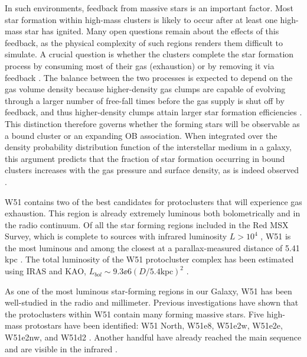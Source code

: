 In such environments, feedback from massive stars is an important factor.  Most star
formation within high-mass clusters is likely to occur after at least one
high-mass star has ignited.  Many open questions remain about the effects of
this feedback, as the physical complexity of such regions renders them
difficult to simulate.  A crucial question is whether the clusters complete the
star formation process by consuming most of their gas (exhaustion) or
by removing it via feedback 
\citep[expulsion;][]{Kruijssen2012b,Longmore2014a,Matzner2015a}.
The balance between the two processes is expected to depend on the gas volume
density because higher-density gas clumps are capable of evolving through a
larger number of free-fall times before the gas supply is shut off by feedback,
and thus higher-density clumps attain larger star formation efficiencies
\citep{Kruijssen2012b}.
This distinction therefore governs whether the forming stars will be observable as a
bound cluster or an expanding OB association.
When integrated over the density probability distribution function of the
interstellar medium in a galaxy, this argument predicts that the fraction of
star formation occurring in bound clusters increases with the gas pressure and
surface density, as is indeed observed \citep{Goddard2010a,Kruijssen2012a,Adamo2015a}.


W51 contains two of the best candidates for protoclusters that will experience
gas exhaustion.  This region is already extremely luminous both bolometrically
and in the radio continuum.  Of all the star forming regions included in the
Red MSX Survey, which is complete to sources with infrared luminosity $L>10^4$
\lsun, W51 is the most luminous \citep{Urquhart2014a} and among the closest at
a parallax-measured distance of 5.41 kpc \citep{Sato2010a,Xu2009a}.  The total
luminosity of the W51 protocluster complex has been estimated using IRAS and
KAO, $L_{bol}\sim9.3\ee{6} (D/5.4\mathrm{kpc})^2$ \lsun
\citep{Harvey1986a,Sievers1991a}.  

As one of the most luminous star-forming regions in our Galaxy, W51 has been
well-studied in the radio and millimeter.  
Previous investigations have shown that the protoclusters within W51 contain many
forming massive stars. Five high-mass protostars have been identified:
W51 North, W51e8, W51e2w, W51e2e, W51e2nw, and W51d2
\citep{Zhang1997a,Keto2008b,Zapata2008a,Zapata2009a,Zapata2010a,Shi2010b,Shi2010a,Surcis2012a,Goddi2015a,Goddi2016a}.
Another handful have already reached the main sequence and are visible in the
infrared \citep{Goldader1994a,Okumura2000a,Kumar2004a,Barbosa2008a,Figueredo2008a}.

